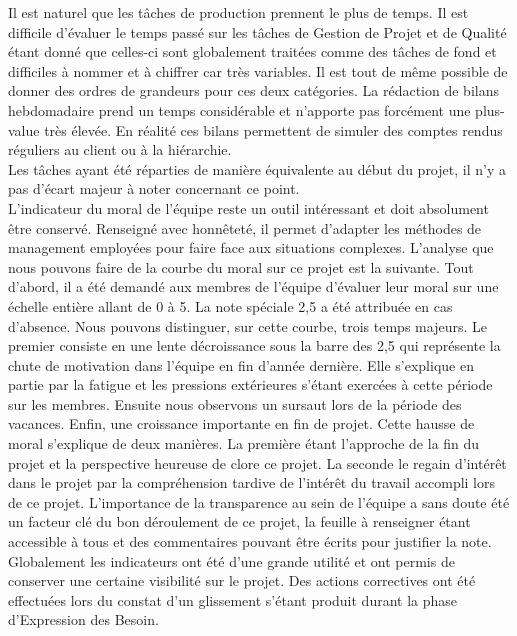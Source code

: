 Il est naturel que les tâches de production prennent le plus de temps. Il est difficile d’évaluer le temps passé sur les tâches de Gestion de Projet et de Qualité étant donné que celles-ci sont globalement traitées comme des tâches de fond et difficiles à nommer et à chiffrer car très variables. Il est tout de même possible de donner des ordres de grandeurs pour ces deux catégories. La rédaction de bilans hebdomadaire prend un temps considérable et n’apporte pas forcément une plus-value très élevée. En réalité ces bilans permettent de simuler des comptes rendus réguliers au client ou à la hiérarchie. \\

Les tâches ayant été réparties de manière équivalente au début du projet, il n’y a pas d’écart majeur à noter concernant ce point.  \\

L’indicateur du moral de l’équipe reste un outil intéressant et doit absolument être conservé. Renseigné avec honnêteté, il permet d’adapter les méthodes de management employées pour faire face aux situations complexes. L’analyse que nous pouvons faire de la courbe du moral sur ce projet est la suivante. Tout d’abord, il a été demandé aux membres de l’équipe d’évaluer leur moral sur une échelle entière allant de 0 à 5. La note spéciale 2,5 a été attribuée en cas d’absence. Nous  pouvons distinguer, sur cette courbe, trois temps majeurs. Le premier consiste en une lente décroissance sous la barre des 2,5 qui représente la chute de motivation dans l’équipe en fin d’année dernière. Elle s’explique en partie par la fatigue et les pressions extérieures s’étant exercées à cette période sur les membres. Ensuite nous observons un sursaut lors de la période des vacances. Enfin, une croissance importante en fin de projet. Cette hausse de moral s’explique de deux manières. La première étant l’approche de la fin du projet et la perspective heureuse de clore ce projet. La seconde le regain d’intérêt dans le projet par la compréhension tardive de l’intérêt du travail accompli lors de ce projet. L’importance de la transparence au sein de l’équipe a sans doute été un facteur clé du bon déroulement de ce projet, la feuille à renseigner étant accessible à tous et des commentaires pouvant être écrits pour justifier la note. \\

Globalement les indicateurs ont été d’une grande utilité et ont permis de conserver une certaine visibilité sur le projet. Des actions correctives ont été effectuées lors du constat d’un glissement s’étant produit durant la phase d’Expression des Besoin. \\